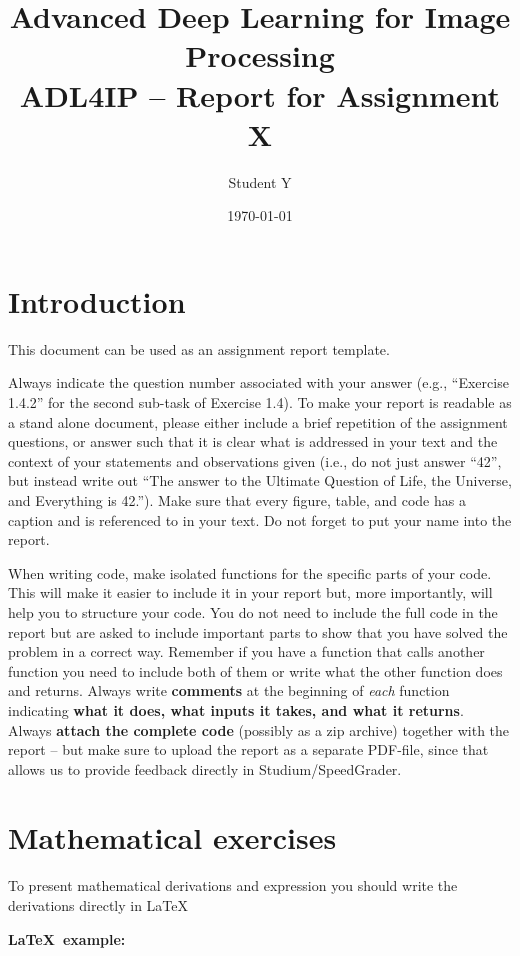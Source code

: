 \documentclass[a4paper,10pt]{article}
\title{\textbf{Advanced Deep Learning for Image Processing} 
\\ ADL4IP -- Report for Assignment X}
\author{Student Y}
\date{\today}
\begin{document}
\maketitle

\section{Introduction}

This document can be used as an assignment report template. 

Always indicate the question number associated with your answer (e.g., ``Exercise 1.4.2'' for the second sub-task of Exercise 1.4). To make your report is readable as a stand alone document, 
please either include a brief repetition of the assignment questions, or answer such that it is clear what is addressed in your text and the context of your statements and observations given (i.e., do not just answer ``42'', but instead write out ``The answer to the Ultimate Question of Life, the Universe, and Everything is 42.''\cite{Adams}). 
Make sure that every figure, table, and code has a caption and is referenced to in your text. Do not forget to put your name into the report.

When writing code, make isolated functions for the specific parts of your code. This will make it easier to include it in your report but, more importantly, will help you to structure your code. You do not need to include the full code in the report but are asked to include important parts to show that you have solved the problem in a correct way. Remember if you have a function that calls another function you need to include both of them or write what the other function does and returns. 
Always write \textbf{comments} at the beginning of \textit{each} function indicating \textbf{what it does, what inputs it takes, and what it returns}.
Always \textbf{attach the complete code} (possibly as a zip archive) together with the report -- but make sure to upload the report as a separate PDF-file, since that allows us to provide feedback directly in Studium/SpeedGrader.

\section{Mathematical exercises}

To present mathematical derivations and expression you should write the derivations directly in \LaTeX\ 

\textbf{\LaTeX\ example:}
\end{document}
